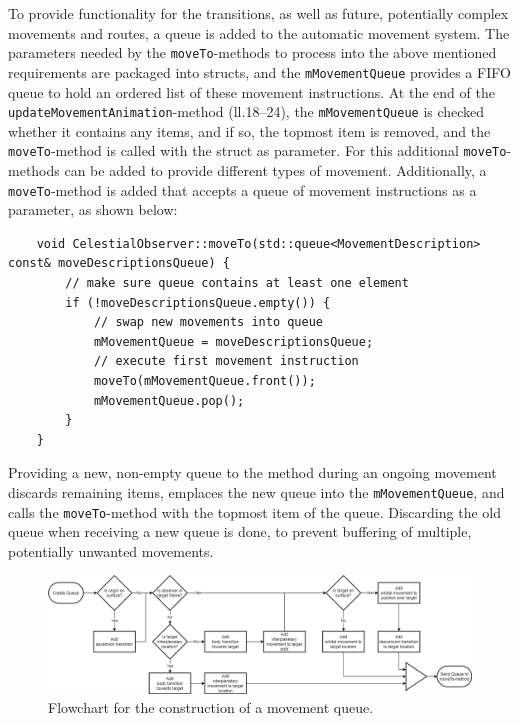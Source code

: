 To provide functionality for the transitions, as well as future, potentially complex movements and routes, a queue is
added to the automatic movement system.
The parameters needed by the \texttt{moveTo}-methods to process into the above mentioned requirements are
packaged into structs, and the \texttt{mMovementQueue} provides a FIFO queue to hold an ordered list of these
movement instructions.
At the end of the \texttt{updateMovementAnimation}-method (ll.\@18--24), the
\texttt{mMovementQueue} is checked whether it contains any items, and if so, the topmost item is removed, and the
\texttt{moveTo}-method is called with the struct as parameter.
For this additional \texttt{moveTo}-methods can be added to provide different types of movement.
Additionally, a \texttt{moveTo}-method is added that accepts a queue of movement instructions as a parameter, as
shown below:
\newpage
\begin{verbatim}
    void CelestialObserver::moveTo(std::queue<MovementDescription> const& moveDescriptionsQueue) {
        // make sure queue contains at least one element
        if (!moveDescriptionsQueue.empty()) {
            // swap new movements into queue
            mMovementQueue = moveDescriptionsQueue;
            // execute first movement instruction
            moveTo(mMovementQueue.front());
            mMovementQueue.pop();
        }
    }
\end{verbatim}
Providing a new, non-empty queue to the method during an ongoing movement discards remaining items, emplaces the
new queue into the \texttt{mMovementQueue}, and calls the \texttt{moveTo}-method with the topmost item
of the queue.
Discarding the old queue when receiving a new queue is done, to prevent buffering of multiple, potentially unwanted
movements.

\begin{figure}[h]
    \centering
    \includegraphics[width=\textwidth]{content/4_3_autoNavigation/img/QueueConstructionFlowchart}
    \caption{Flowchart for the construction of a movement queue.}
    \label{fig:movement-queue}
\end{figure}

